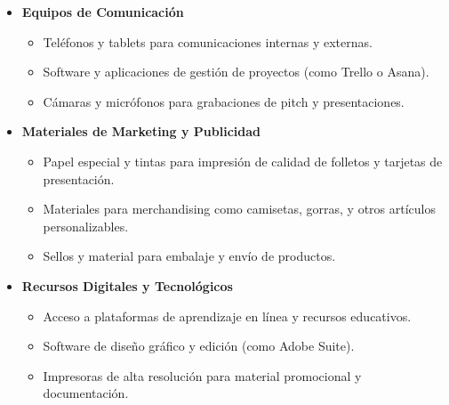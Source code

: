 \begin{itemize}
  \item \textbf{Equipos de Comunicación}
  \begin{itemize}
      \item Teléfonos y tablets para comunicaciones internas y externas.
      \item Software y aplicaciones de gestión de proyectos (como Trello o Asana).
      \item Cámaras y micrófonos para grabaciones de pitch y presentaciones.
  \end{itemize}
  
  \item \textbf{Materiales de Marketing y Publicidad}
  \begin{itemize}
      \item Papel especial y tintas para impresión de calidad de folletos y tarjetas de presentación.
      \item Materiales para merchandising como camisetas, gorras, y otros artículos personalizables.
      \item Sellos y material para embalaje y envío de productos.
  \end{itemize}
  
  \item \textbf{Recursos Digitales y Tecnológicos}
  \begin{itemize}
      \item Acceso a plataformas de aprendizaje en línea y recursos educativos.
      \item Software de diseño gráfico y edición (como Adobe Suite).
      \item Impresoras de alta resolución para material promocional y documentación.
  \end{itemize}
\end{itemize}